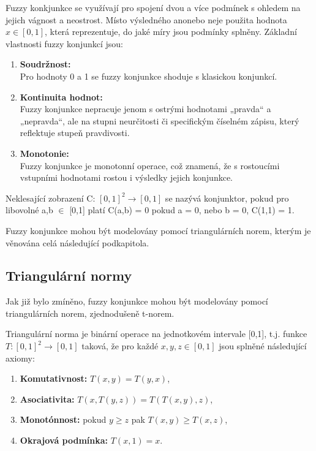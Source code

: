 Fuzzy konkjunkce se využívají pro spojení dvou a více podmínek s ohledem na jejich vágnost a neostrost. Místo výsledného \clqq ano\crqq \space nebo \clqq ne\crqq \space je použita hodnota  $x \in [0,1]$, která reprezentuje, do jaké míry jsou podmínky splněny.  
Základní vlastnosti fuzzy konjunkcí jsou:
\begin{enumerate}
    \item \textbf{Soudržnost:}\\
    Pro hodnoty 0 a 1 se fuzzy konjunkce shoduje s klasickou konjunkcí.
    \item \textbf{Kontinuita hodnot:}\\
    Fuzzy konjunkce nepracuje jenom s  ostrými hodnotami „pravda“ a „nepravda“, ale na stupni neurčitosti či specifickým číselném zápisu, který reflektuje stupeň pravdivosti.
    \item \textbf{Monotonie:}\\
    Fuzzy konjunkce je monotonní operace, což znamená, že s rostoucími vstupními hodnotami rostou i výsledky jejich konjunkce.
\end{enumerate}
\begin{definition}
    \cite{KMP}
    Neklesající zobrazení C: $[0,1]^2 \rightarrow [0,1]$ se nazývá konjunktor, pokud pro libovolné a,b $\in$ [0,1] platí
    C(a,b) = 0 pokud a = 0, nebo b = 0,
    C(1,1) = 1.
    \end{definition}

\begin{remark}
    Fuzzy konjunkce mohou být modelovány pomocí triangulárních norem, kterým je věnována celá následující podkapitola.
\end{remark}

\subsection{Triangul\'arn\'i normy} 

Jak již bylo zmíněno, fuzzy konjunkce mohou být modelov\' any pomocí triangulárních norem, zjednodušeně t-norem. 
\begin{definition}
\cite{KMP}
    Triangulární norma je binární operace na jednotkovém intervale [0,1], t.j. funkce $T: [0,1]^2 \rightarrow [0,1]$ taková, že pro každé $x, y, z \in [0,1]$ jsou splněné následující axiomy:
    \begin{enumerate}
        \item \textbf{Komutativnost:} $T(x,y) = T(y,x)$,
        \item \textbf{Asociativita:} $T(x, T(y, z)) = T(T(x, y), z)$,
        \item \textbf{Monotónnost:} pokud $y \geq z$ pak $T(x, y) \geq T(x, z)$,
        \item \textbf{Okrajová podmínka:} $T(x, 1) = x$.
    \end{enumerate}
\end{definition}

